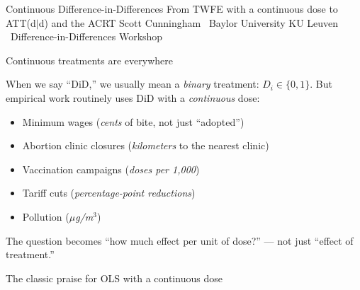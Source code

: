 \documentclass[aspectratio=169,12pt,t]{beamer}
\begin{document}

\codechellatitle
  {Continuous Difference-in-Differences}
  {From TWFE with a continuous dose to ATT(d$|$d) and the ACRT}
  {Scott Cunningham \textperiodcentered\ Baylor University}
  {KU Leuven \textperiodcentered\ Difference-in-Differences Workshop}


\begin{frame}{Continuous treatments are everywhere}
\vspace{0.2cm}

When we say ``DiD,'' we usually mean a \textit{binary} treatment: $D_i \in \{0,1\}$. \;But empirical work routinely uses DiD with a \textit{continuous} dose:

\vspace{0.4cm}
\begin{itemize}\small\setlength\itemsep{1pt}
  \item Minimum wages (\textit{cents} of bite, not just ``adopted'')
  \item Abortion clinic closures (\textit{kilometers} to the nearest clinic)
  \item Vaccination campaigns (\textit{doses per 1{,}000})
  \item Tariff cuts (\textit{percentage-point reductions})
  \item Pollution (\textit{$\mu$g/m$^3$})
\end{itemize}

\vspace{0.3cm}
 \;The question becomes ``how much effect per unit of dose?'' --- not just ``effect of treatment.''
\end{frame}

\begin{frame}{The classic praise for OLS with a continuous dose}
\vspace{0.2cm}


\vspace{0.5cm}


\vspace{0.4em}
\end{frame}
\end{document}
